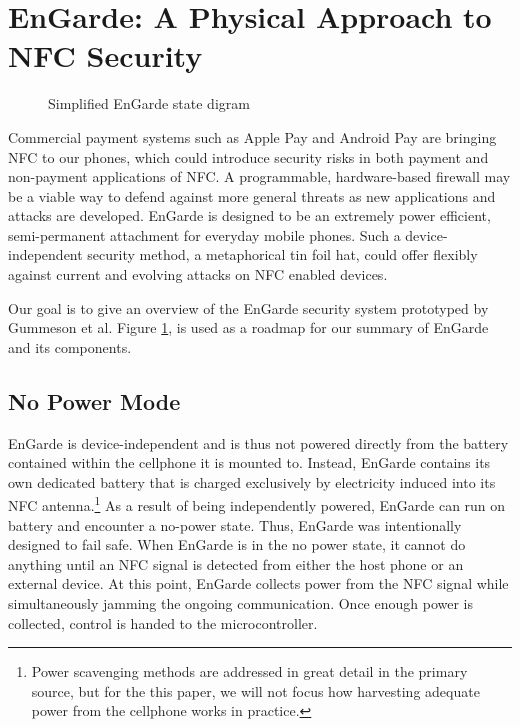 \documentclass{sig-alternate}
\begin{document}
\section{EnGarde: A Physical Approach to NFC Security}
\label{sec:enGarde}

\begin{figure}
\centering
{}
\caption{Simplified EnGarde\cite{Gum2013} state digram}
\label{fig:states}
\end{figure}

Commercial payment systems such as Apple Pay and Android Pay are bringing NFC to our phones, which could introduce security risks in both payment and non-payment applications of NFC. A programmable, hardware-based firewall may be a viable way to defend against more general threats as new applications and attacks are developed. EnGarde is designed to be an extremely power efficient, semi-permanent attachment for everyday mobile phones. Such a device-independent security method, a metaphorical tin foil hat, could offer flexibly against current and evolving attacks on NFC enabled devices.~\cite{Gum2013}

Our goal is to give an overview of the EnGarde security system prototyped by Gummeson et al. Figure \ref{fig:states}, is used as a roadmap for our summary of EnGarde and its components.

\subsection{No Power Mode}

EnGarde is device-independent and is thus not powered directly from the battery contained within the cellphone it is mounted to. Instead, EnGarde contains its own dedicated battery that is charged exclusively by electricity induced into its NFC antenna.\footnote{Power scavenging methods are addressed in great detail in the primary source, but for the this paper, we will not focus how harvesting adequate power from the cellphone works in practice.} 
As a result of being independently powered, EnGarde can run on battery and encounter a no-power state. Thus, EnGarde was intentionally designed to fail safe. When EnGarde is in the no power state, it cannot do anything until an NFC signal is detected from either the host phone or an external device. At this point, EnGarde collects power from the NFC signal while simultaneously jamming the ongoing communication. Once enough power is collected, control is handed to the microcontroller.
\end{document}
